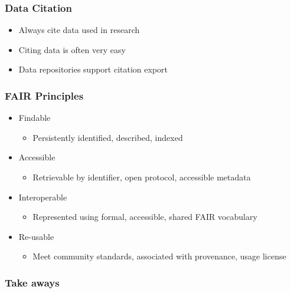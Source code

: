 \documentclass{beamer}
\begin{document}
\begin{frame}
  \frametitle{Data Citation}
  
  \begin{itemize}
  \item Always cite data used in research
  \item Citing data is often very easy
  \item Data repositories support citation export
  \end{itemize}
\end{frame}

{
	\begin{frame}[plain]
	\end{frame}
}

\begin{frame}
  \frametitle{FAIR Principles}
  
  \begin{itemize}
  \item Findable
  \begin{itemize}
  \item Persistently identified, described, indexed
  \end{itemize}
  \item Accessible
  \begin{itemize}
  \item Retrievable by identifier, open protocol, accessible metadata
  \end{itemize}
  \item Interoperable
  \begin{itemize}
  \item Represented using formal, accessible, shared FAIR vocabulary
  \end{itemize}
  \item Re-usable
  \begin{itemize}
  \item Meet community standards, associated with provenance, usage license
  \end{itemize}
  \end{itemize}
\end{frame}


\begin{frame}
  \frametitle{Take aways}
  
\end{frame}
\end{document}

